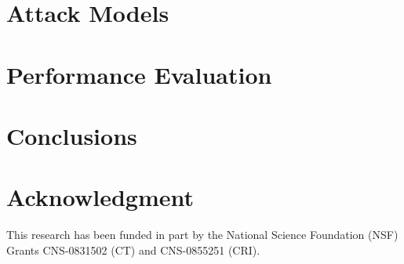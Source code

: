 \documentclass[10pt,conference,letterpaper]{IEEEtran}
\begin{document}
\section{Attack Models}\label{sec-attack}


\section{Performance Evaluation}\label{sec-evaluation}


\section{Conclusions}\label{sec-conc}


\section*{Acknowledgment}
This research has been funded in part by the National Science
Foundation (NSF) Grants CNS-0831502 (CT) and CNS-0855251 (CRI).



\end{document}
